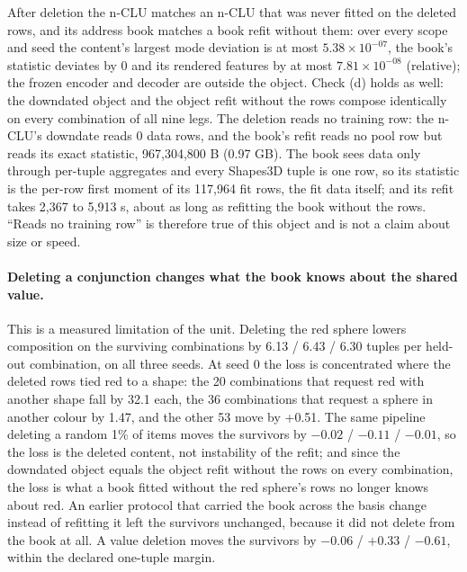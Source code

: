 \documentclass{article} %
\newcommand{\sci}[2]{\ensuremath{#1\times10^{#2}}}
\begin{document}
\noindent After deletion the n-CLU matches an n-CLU that was never fitted on the deleted rows, and its address
book matches a book refit without them: over every scope and seed the content's largest mode
deviation is at most \sci{5.38}{-07}, the book's statistic deviates by 0 and its rendered features by
at most \sci{7.81}{-08} (relative); the frozen encoder and decoder are outside the object. Check (d)
holds as well: the downdated object and the object refit without the rows compose identically on every
combination of all nine legs.
 The deletion reads no training row: the n-CLU's downdate reads 0 data rows, and the %
book's refit reads no pool row but reads its exact statistic, 967,304,800 B (0.97 GB). The book sees %
data only through per-tuple aggregates and every Shapes3D tuple is one row, so its statistic is the
per-row first moment of its 117,964 fit rows, the fit data itself; and its refit takes 2,367 to %
5,913 s, about as long as refitting the book without the rows. ``Reads no training row'' is %
therefore true of this object and is not a claim about size or speed.

\paragraph{Deleting a conjunction changes what the book knows about the shared value.} This is a
measured limitation of the unit. Deleting the red sphere lowers composition on the surviving combinations
by 6.13 / 6.43 / 6.30 tuples per held-out combination, on all three seeds. At seed 0 the loss is concentrated where %
the deleted rows tied red to a shape: the 20 combinations that request red with another shape fall by %
32.1 each, the 36 combinations that request a sphere in another colour by 1.47, and the other 53 move %
by +0.51. The same pipeline deleting a random 1\% of items moves the survivors by $-0.02$ / %
$-0.11$ / $-0.01$, so the loss is the deleted content, not instability of the refit; and since the %
downdated object equals the object refit without the rows on every combination, the loss is what a book
fitted without the red sphere's rows no longer knows about red. An earlier protocol that carried the
book across the basis change instead of refitting it left the survivors unchanged, because it did
not delete from the book at all. A value deletion moves the survivors by $-0.06$ / $+0.33$ / %
$-0.61$, within the declared one-tuple margin. %
\end{document}
